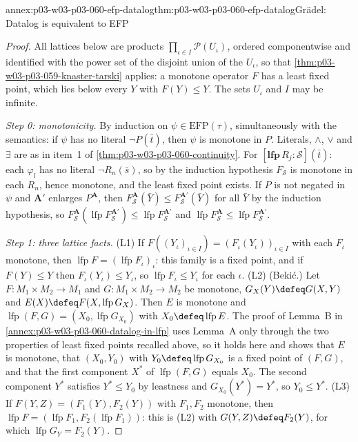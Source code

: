 \begin{annexitem}{annex:p03-w03-p03-060-efp-datalog}{thm:p03-w03-p03-060-efp-datalog}{Gr\"adel: Datalog is equivalent to EFP}
\begin{proof}
All lattices below are products \(\prod_{\iota\in I}\mathcal P(U_\iota)\),
ordered componentwise and identified with the power set of the disjoint
union of the \(U_\iota\), so that \cref{thm:p03-w03-p03-059-knaster-tarski}
applies: a monotone operator \(F\) has a least fixed point, which lies
below every \(Y\) with \(F(Y)\le Y\). The sets \(U_\iota\) and \(I\) may be
infinite.

\emph{Step 0: monotonicity.} By induction on \(\psi\in\mathrm{EFP}(\tau)\),
simultaneously with the semantics: if \(\psi\) has no literal
\(\neg P(\bar t)\), then \(\psi\) is monotone in \(P\). Literals, \(\wedge\),
\(\vee\) and \(\exists\) are as in item~1 of
\cref{thm:p03-w03-p03-060-continuity}. For
\([\mathbf{lfp}\,R_j:\mathcal S](\bar t)\): each \(\varphi_l\) has no
literal \(\neg R_n(\bar s)\), so by the induction hypothesis
\(F_{\mathcal S}\) is monotone in each \(R_n\), hence monotone, and the
least fixed point exists. If \(P\) is not negated in \(\psi\) and
\(\mathbf A'\) enlarges \(P^{\mathbf A}\), then
\(F^{\mathbf A}_{\mathcal S}(\bar Y)\le F^{\mathbf A'}_{\mathcal S}(\bar Y)\)
for all \(\bar Y\) by the induction hypothesis, so
\(F^{\mathbf A}_{\mathcal S}(\operatorname{lfp}F^{\mathbf A'}_{\mathcal S})\le\operatorname{lfp}F^{\mathbf A'}_{\mathcal S}\)
and \(\operatorname{lfp}F^{\mathbf A}_{\mathcal S}\le\operatorname{lfp}F^{\mathbf A'}_{\mathcal S}\).

\emph{Step 1: three lattice facts.} (L1) If
\(F((Y_\iota)_{\iota\in I})=(F_\iota(Y_\iota))_{\iota\in I}\) with each
\(F_\iota\) monotone, then
\(\operatorname{lfp}F=(\operatorname{lfp}F_\iota)_\iota\): this family is a
fixed point, and if \(F(Y)\le Y\) then \(F_\iota(Y_\iota)\le Y_\iota\), so
\(\operatorname{lfp}F_\iota\le Y_\iota\) for each \(\iota\). (L2) (Beki\'c.)
Let \(F\colon M_1\times M_2\to M_1\) and \(G\colon M_1\times M_2\to M_2\)
be monotone, \(G_X(Y)\defeq G(X,Y)\) and
\(E(X)\defeq F(X,\operatorname{lfp}G_X)\). Then \(E\) is monotone and
\(\operatorname{lfp}(F,G)=(X_0,\operatorname{lfp}G_{X_0})\) with
\(X_0\defeq\operatorname{lfp}E\). The proof of Lemma~B in
\cref{annex:p03-w03-p03-060-datalog-in-lfp} uses Lemma~A only through the
two properties of least fixed points recalled above, so it holds here and
shows that \(E\) is monotone, that \((X_0,Y_0)\) with
\(Y_0\defeq\operatorname{lfp}G_{X_0}\) is a fixed point of \((F,G)\), and
that the first component \(X^\ast\) of \(\operatorname{lfp}(F,G)\) equals
\(X_0\). The second component \(Y^\ast\) satisfies \(Y^\ast\le Y_0\) by
leastness and \(G_{X_0}(Y^\ast)=Y^\ast\), so \(Y_0\le Y^\ast\). (L3) If
\(F(Y,Z)=(F_1(Y),F_2(Y))\) with \(F_1,F_2\) monotone, then
\(\operatorname{lfp}F=(\operatorname{lfp}F_1,F_2(\operatorname{lfp}F_1))\):
this is (L2) with \(G(Y,Z)\defeq F_2(Y)\), for which
\(\operatorname{lfp}G_Y=F_2(Y)\).


\end{proof}
\end{annexitem}

